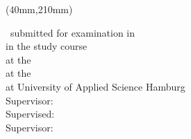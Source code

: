 %
%
\title{\IthesisTitle}   %
\author{\IthesisAuthor} %

\newpage
\thispagestyle{empty}
{\selectfont
  \hfuzz=20pt       %

  \vspace*{1cm}
  \begin{minipage}[b]{\textwidth}
    \fontsize{14pt}{20pt}
    \selectfont
    \begin{center}
      \IthesisAuthor
    \end{center}
  \end{minipage}

  \vspace{1.5cm}
  \begin{minipage}[b][0cm][t]{\textwidth}
    \fontsize{18pt}{20pt}
    \selectfont
    \begin{center}
      \IthesisTitle
    \end{center}
  \end{minipage}

  \begin{textblock*}{\textwidth}(40mm,210mm)
    \begin{minipage}[b]{\textwidth}
      \selectfont
      \fontsize{12pt}{14pt}
      \selectfont
      \ifdefined\ILanguageEN
        \IthesisKindEN ~submitted for examination in \IthesisExaminationEN \\
        in the study course \textit{\IstudyCourseName} \\
        at the \IthesisDepartmentFullEN \\
        at the \IthesisFacultyFullEN \\
        at University of Applied Science Hamburg\\

        Supervisor: \IfirstSv \\
        \ifdefined\IisTermPaper
        \else
          \ifdefined\IisInternshipReport
	  Supervised: \IsecondSv\\
          \else
        Supervisor: \IsecondSv \\
          \fi\fi
        

\end{minipage}
\end{textblock*}}
